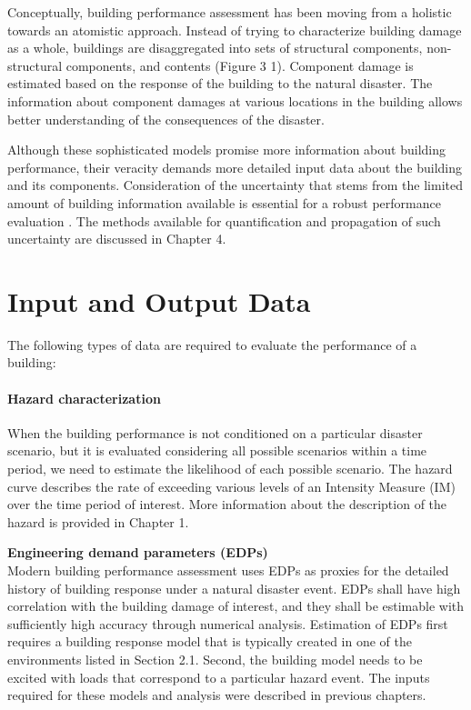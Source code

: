 Conceptually, building performance assessment has been moving from a holistic towards an atomistic approach. Instead of trying to characterize building damage as a whole, buildings are disaggregated into sets of structural components, non-structural components, and contents (Figure 3 1). Component damage is estimated based on the response of the building to the natural disaster. The information about component damages at various locations in the building allows better understanding of the consequences of the disaster. 

Although these sophisticated models promise more information about building performance, their veracity demands more detailed input data about the building and its components. Consideration of the uncertainty that stems from the limited amount of building information available is essential for a robust performance evaluation \citep{bradley2013critical}. The methods available for quantification and propagation of such uncertainty are discussed in Chapter 4.
 
\section{Input and Output Data}
\label{sec:perf_bldg_io}

The following types of data are required to evaluate the performance of a building:

\paragraph{Hazard characterization} When the building performance is not conditioned on a particular disaster scenario, but it is evaluated considering all possible scenarios within a time period, we need to estimate the likelihood of each possible scenario. The hazard curve describes the rate of exceeding various levels of an Intensity Measure (IM) over the time period of interest. More information about the description of the hazard is provided in Chapter 1.
\newline

\noindent\textbf{Engineering demand parameters (EDPs)} \\Modern building performance assessment uses EDPs as proxies for the detailed history of building response under a natural disaster event. EDPs shall have high correlation with the building damage of interest, and they shall be estimable with sufficiently high accuracy through numerical analysis. Estimation of EDPs first requires a building response model that is typically created in one of the environments listed in Section 2.1. Second, the building model needs to be excited with loads that correspond to a particular hazard event. The inputs required for these models and analysis were described in previous chapters.

